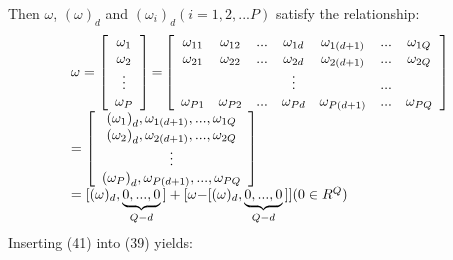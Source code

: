 \documentclass[journal]{IEEEtran}
\begin{document}
Then ${\omega}$, ${(\omega )_d}$ and ${({\omega _i})_d}(i = 1,2,...P)$ satisfy the relationship:
\begin{equation}
\begin{array}{l}
 \omega  = \left[ {\begin{array}{*{20}{c}}
   {{\omega _1}}  \\
   {{\omega _2}}  \\
    \vdots   \\
   {{\omega _P}}  \\
\end{array}} \right]{\rm{ = }}\left[ {\begin{array}{*{20}{c}}
   {{\omega _{11}}} & {{\omega _{12}}} & {...} & {{\omega _{1d}}} & {{\omega _{1(d + 1)}}} & {...} & {{\omega _{1Q}}}  \\
   {{\omega _{21}}} & {{\omega _{22}}} & {...} & {{\omega _{2d}}} & {{\omega _{2(d + 1)}}} & {...} & {{\omega _{2Q}}}  \\
   {} & {} & {} &  \vdots  & {} & {...} & {}  \\
   {{\omega _{P1}}} & {{\omega _{P2}}} & {...} & {{\omega _{Pd}}} & {{\omega _{P(d + 1)}}} & {...} & {{\omega _{PQ}}}  \\
\end{array}} \right] \\
  = \left[ {\begin{array}{*{20}{c}}
   {{{({\omega _1})}_d},{\omega _{1(d + 1)}},...,{\omega _{1Q}}}  \\
   {{{({\omega _2})}_d},{\omega _{2(d + 1)}},...,{\omega _{2Q}}}  \\
    \vdots   \\
   {{{({\omega _P})}_d},{\omega _{P(d + 1)}},...,{\omega _{PQ}}}  \\
\end{array}} \right] \\
  = {\rm{[(}}\omega {)_d},\underbrace {0,...,0}_{Q - d}{\rm{] + [}}\omega {\rm{ - [(}}\omega {)_d},\underbrace {0,...,0}_{Q - d}{\rm{]]   (}}0 \in {R^Q}{\rm{)}} \\
 \end{array}
\end{equation}
Inserting (41) into (39) yields:
\end{document}
